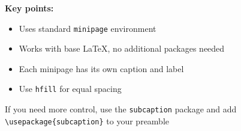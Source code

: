 \begin{frame}
	     
	\textbf{Key points:}
	\begin{itemize}
		\item Uses standard \texttt{minipage} environment
		\item Works with base LaTeX, no additional packages needed
		\item Each minipage has its own caption and label
		\item Use \texttt{hfill} for equal spacing
	\end{itemize}
	
	\begin{tip}
		If you need more control, use the \texttt{subcaption} package and add \texttt{\textbackslash usepackage\{subcaption\}} to your preamble
	\end{tip}
\end{frame}
